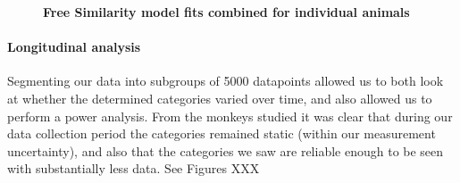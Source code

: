 \begin{figure}
    \centering
    \begin{subfigure}[b]{0.49\textwidth}
         \centering
         \caption{}
         
         \label{fig:SimilarityMatrixPollux}
    \end{subfigure}
    \hfill
    \begin{subfigure}[b]{0.49\textwidth}
         \centering
         \caption{}
             
         \label{fig:SimilarityMatrixCastor}
    \end{subfigure}
    
    \begin{subfigure}[b]{0.49\textwidth}
         \centering
         \caption{}
             
         \label{fig:SimilarityMatrixBuster}
     \end{subfigure}
     \hfill
     \begin{subfigure}[b]{0.49\textwidth}
         \centering
         \caption{}
             
         \label{fig:SimilarityMatrixMorty}
     \end{subfigure}
        \caption{\textbf{Free Similarity model fits combined for individual animals} }
        \label{fig:SimilarityMatrixIndividual}
\end{figure}


\paragraph{Longitudinal analysis}

Segmenting our data into subgroups of 5000 datapoints allowed us to both look at whether the determined categories varied over time, and also allowed us to perform a power analysis. From the monkeys studied it was clear that during our data collection period the categories remained static (within our measurement uncertainty), and also that the categories we saw are reliable enough to be seen with substantially less data. See Figures XXX %